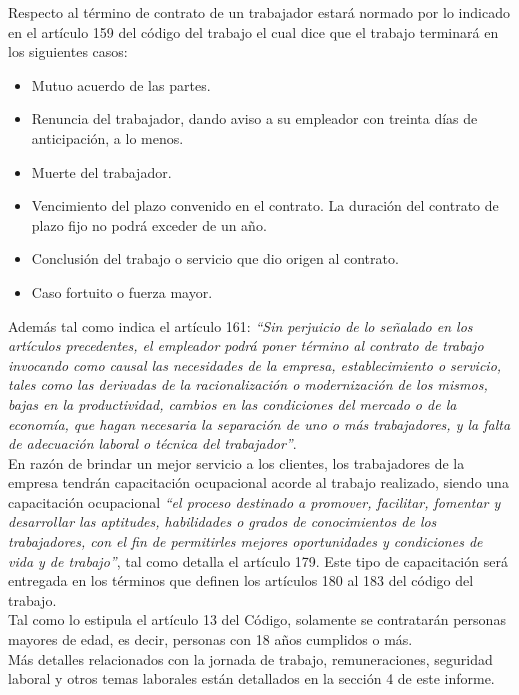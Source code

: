 Respecto al término de contrato de un trabajador estará normado por lo indicado en el artículo
159 del código del trabajo el cual dice que el trabajo terminará en los siguientes casos:

\begin{itemize}
  \item Mutuo acuerdo de las partes.
  \item Renuncia del trabajador, dando aviso a su empleador con treinta días de anticipación, a lo menos.
  \item Muerte del trabajador.
  \item Vencimiento del plazo convenido en el contrato. La duración del contrato de plazo fijo no podrá exceder de un año.
  \item Conclusión del trabajo o servicio que dio origen al contrato.
  \item Caso fortuito o fuerza mayor.
\end{itemize}

Además tal como indica el artículo 161: \emph{``Sin perjuicio de lo señalado en los artículos precedentes, 
el empleador podrá poner término al contrato de trabajo invocando como causal las necesidades de la empresa, 
establecimiento o servicio, tales como las derivadas de la racionalización o modernización de los mismos, bajas 
en la productividad, cambios en las condiciones del mercado o de la economía, que hagan necesaria la separación 
de uno o más trabajadores, y la falta de adecuación laboral o técnica del trabajador''}.\\

En razón de brindar un mejor servicio a los clientes, los trabajadores de la empresa tendrán capacitación
ocupacional acorde al trabajo realizado, siendo una capacitación ocupacional \emph{``el proceso destinado a promover, 
facilitar, fomentar y desarrollar las aptitudes, habilidades o grados de conocimientos de los trabajadores, con el 
fin de permitirles mejores oportunidades y condiciones de vida y de trabajo''}, tal como detalla el artículo 179.
Este tipo de capacitación será entregada en los términos que definen los artículos 180 al 183 del código del
trabajo.\\

Tal como lo estipula el artículo 13 del Código, solamente se contratarán personas mayores de edad, es decir,
personas con 18 años cumplidos o más.\\

Más detalles relacionados con la jornada de trabajo, remuneraciones, seguridad laboral y otros temas laborales están 
detallados en la sección 4 de este informe.


